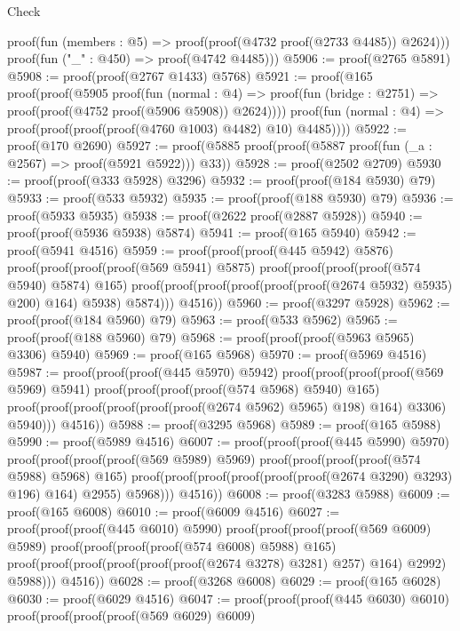 \begin{lexlean}{Check}
\begin{coremodule}
        proof(fun (members : @5) => proof(proof(@4732 proof(@2733 @4485)) @2624)))
      proof(fun ("_" : @450) => proof(@4742 @4485)))
@5906 := proof(@2765 @5891)
@5908 := proof(proof(@2767 @1433) @5768)
@5921 := proof(@165
      proof(proof(@5905
            proof(fun (normal : @4) =>
              proof(fun (bridge : @2751) => proof(proof(@4752 proof(@5906 @5908)) @2624))))
          proof(fun (normal : @4) => proof(proof(proof(proof(@4760 @1003) @4482) @10) @4485))))
@5922 := proof(@170 @2690)
@5927 := proof(@5885 proof(proof(@5887 proof(fun (_a : @2567) => proof(@5921 @5922))) @33))
@5928 := proof(@2502 @2709)
@5930 := proof(proof(@333 @5928) @3296)
@5932 := proof(proof(@184 @5930) @79)
@5933 := proof(@533 @5932)
@5935 := proof(proof(@188 @5930) @79)
@5936 := proof(@5933 @5935)
@5938 := proof(@2622 proof(@2887 @5928))
@5940 := proof(proof(@5936 @5938) @5874)
@5941 := proof(@165 @5940)
@5942 := proof(@5941 @4516)
@5959 := proof(proof(proof(@445 @5942) @5876)
      proof(proof(proof(proof(@569 @5941) @5875)
            proof(proof(proof(proof(@574 @5940) @5874) @165)
                proof(proof(proof(proof(proof(proof(@2674 @5932) @5935) @200) @164) @5938) @5874)))
          @4516))
@5960 := proof(@3297 @5928)
@5962 := proof(proof(@184 @5960) @79)
@5963 := proof(@533 @5962)
@5965 := proof(proof(@188 @5960) @79)
@5968 := proof(proof(proof(@5963 @5965) @3306) @5940)
@5969 := proof(@165 @5968)
@5970 := proof(@5969 @4516)
@5987 := proof(proof(proof(@445 @5970) @5942)
      proof(proof(proof(proof(@569 @5969) @5941)
            proof(proof(proof(proof(@574 @5968) @5940) @165)
                proof(proof(proof(proof(proof(proof(@2674 @5962) @5965) @198) @164) @3306) @5940)))
          @4516))
@5988 := proof(@3295 @5968)
@5989 := proof(@165 @5988)
@5990 := proof(@5989 @4516)
@6007 := proof(proof(proof(@445 @5990) @5970)
      proof(proof(proof(proof(@569 @5989) @5969)
            proof(proof(proof(proof(@574 @5988) @5968) @165)
                proof(proof(proof(proof(proof(proof(@2674 @3290) @3293) @196) @164) @2955) @5968)))
          @4516))
@6008 := proof(@3283 @5988)
@6009 := proof(@165 @6008)
@6010 := proof(@6009 @4516)
@6027 := proof(proof(proof(@445 @6010) @5990)
      proof(proof(proof(proof(@569 @6009) @5989)
            proof(proof(proof(proof(@574 @6008) @5988) @165)
                proof(proof(proof(proof(proof(proof(@2674 @3278) @3281) @257) @164) @2992) @5988)))
          @4516))
@6028 := proof(@3268 @6008)
@6029 := proof(@165 @6028)
@6030 := proof(@6029 @4516)
@6047 := proof(proof(proof(@445 @6030) @6010)
      proof(proof(proof(proof(@569 @6029) @6009)

\end{coremodule}
\end{lexlean}
